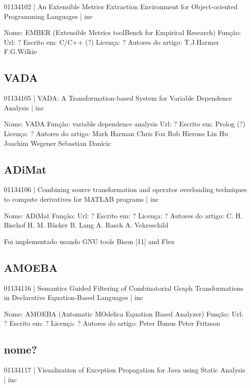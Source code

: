 01134102 | An Extensible Metrics Extraction Environment for Object-oriented Programming Languages | inc

Nome: EMBER (Extensible Metrics toolBench for Empirical Research)
Função: 
Url: ?
Escrito em: C/C++ (?)
Licença: ?
Autores do artigo: T.J.Harmer
                   F.G.Wilkie


\subsection{VADA}

01134105 | VADA: A Transformation-based System for Variable Dependence Analysis | inc

Nome: VADA
Função: variable dependence analysis
Url: ?
Escrito em: Prolog (?)
Licença: ?
Autores do artigo: Mark Harman
                   Chris Fox
                   Rob Hierons
                   Lin Hu
                   Joachim Wegener
                   Sebastian Danicic

\subsection{ADiMat}

01134106 | Combining source transformation and operator overloading techniques to compute derivatives for MATLAB programs | inc

Nome: ADiMat
Função: 
Url: ?
Escrito em: ?
Licença: ?
Autores do artigo: C. H. Bischof
                   H. M. Bücker
                   B. Lang
                   A. Rasch
                   A. Vehreschild

Foi implementado usando GNU tools Bison [11] and Flex

\subsection{AMOEBA}

01134116 | Semantics Guided Filtering of Combinatorial Graph Transformations in Declarative Equation-Based Languages | inc

Nome: AMOEBA (Automatic MOdelica Equation Based Analyzer)
Função: 
Url: ?
Escrito em: ?
Licença: ?
Autores do artigo: Peter Bunus
                   Peter Fritzson


\subsection{nome?}

01134117 | Visualization of Exception Propagation for Java using Static Analysis | inc

